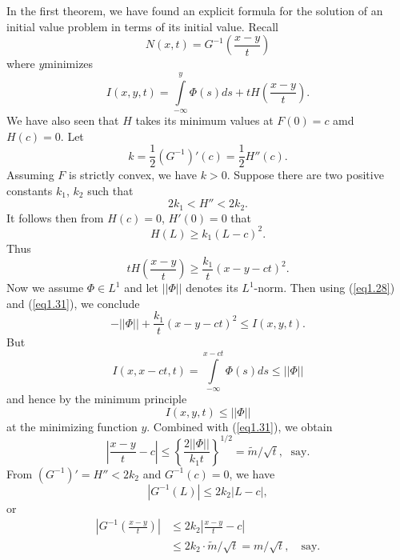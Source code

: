 \medskip
{} 
In the first theorem, we have found an explicit formula for the solution of an initial value problem in terms of its initial value. Recall
\begin{equation*}
N(x,t) = G^{-1} (\frac{x-y}{t})\tag{1.27}\label{eq1.27}
\end{equation*}
where $y$\pageoriginale minimizes
\begin{equation*}
I (x,y,t) = \int\limits^y_{-\infty} \Phi (s) ds  + t H (\frac{x-y}{t}) . \tag{1.28}\label{eq1.28}
\end{equation*}
We have also seen that $H$ takes its minimum values at  $F(0) = c$ amd $H(c) = 0$. Let 
\begin{equation*}
k = \frac{1}{2} (G^{-1})' (c) = \frac{1}{2} H''(c). \tag{1.29}\label{eq1.29}
\end{equation*}
Assuming $F$ is strictly convex, we have $k > 0$. Suppose there are two positive constants $k_1$, $k_2$ such that 
\begin{equation*}
2k_1 < H'' < 2k_2. \tag{1.30}\label{eq1.30}
\end{equation*}
It follows then from $H(c) = 0$, $H'(0) = 0$ that
$$
H(L) \geq k_1 (L-c)^2. 
$$
Thus
\begin{equation*}
t H (\frac{x-y}{t}) \geq \frac{k_1}{t} (x-y -ct)^2. \tag{1.31}\label{eq1.31}
\end{equation*}
Now we assume $\Phi \in L^1$ and let $||\Phi||$ denotes its $L^1$-norm. Then using (\ref{eq1.28}) and (\ref{eq1.31}), we conclude
\begin{equation*}
- ||\Phi|| + \frac{k_1}{t} (x-y-ct)^2 \leq I (x,y,t). \tag{1.32}\label{eq1.32}
\end{equation*}
But 
$$
I(x,x-ct, t) = \int\limits^{x-ct}_{-\infty} \Phi (s)  ds \leq ||\Phi||
$$
and hence by the minimum principle 
$$
I (x,y,t) \leq ||\Phi ||
$$
at the minimizing function $y$. Combined with (\ref{eq1.31}), we obtain
\begin{equation*}
|\frac{x-y}{t} - c| \leq \left\{ \frac{2||\Phi||}{k_1 t} \right\}^{1/2} = \tilde{m} / \sqrt{t}, \; \text{ say}. \tag{1.33}\label{eq1.33}
\end{equation*}\pageoriginale
From $(G^{-1})' = H'' < 2 k_2$ and $G^{-1} (c) =0$, we have 
$$
|G^{-1} (L)| \leq 2 k_2 |L-c|,
$$
or 
\begin{align*}
|G^{-1} (\frac{x-y}{t}) | & \leq 2 k_2 |\frac{x-y}{t} - c|\\
& \leq 2 k_2 \cdot \tilde{m} / \sqrt{t} = m / \sqrt{t}, \quad \text{say}.
\end{align*}
